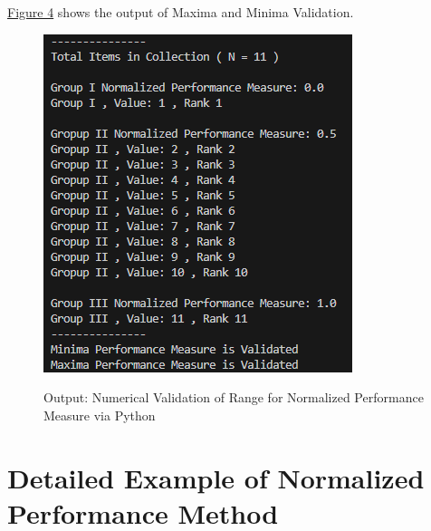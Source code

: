 \documentclass[man,floatsintext]{apa7}
\begin{document}
\hyperref[fig:output-numerical-validation-minima-maxima]{Figure 4} shows the output of Maxima and Minima Validation.
\begin{figure}[!htbp]
	\caption{Output: Numerical Validation of Range for Normalized Performance Measure via Python}
	\centering
	\includegraphics [scale=1]{images/output-validation-minima-maxima.png}
	\label{fig:output-numerical-validation-minima-maxima}
\end{figure}


\section{Detailed Example of Normalized Performance Method}
\printbibliography
\appendix
\end{document}
